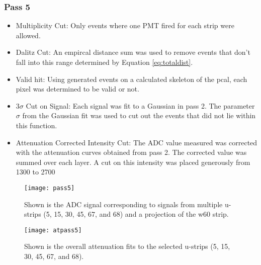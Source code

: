 \subsubsection{Pass 5}
\begin{itemize}
    \item Multiplicity Cut: Only events where one PMT fired for each strip were allowed.
    \item Dalitz Cut: An empircal distance sum was used to remove events that don't fall 
    into this range determined by Equation \ref{eq:totaldist}.
    \item Valid hit: Using generated events on a calculated skeleton of the pcal, each pixel 
    was determined to be valid or not.
    \item 3$\sigma$ Cut on Signal: Each signal was fit to a Gaussian in pass 2. The parameter 
    $\sigma$ from the Gaussian fit was used to cut out the events that did not lie within this function.
    \item Attenuation Corrected Intensity Cut: The ADC value measured was corrected with the 
    attenuation curves obtained from pass 2. The corrected value was summed over each layer. 
    A cut on this intensity was placed generously from 1300 to 2700
\end{itemize}
               
               


\begin{figure}[h]
    \centering
    \texttt{[image: pass5]}
    \caption{Shown is the ADC signal corresponding to signals from multiple u-strips 
    (5, 15, 30, 45, 67, and 68) and a projection of the w60 strip.}
    \label{fig:pass5}
\end{figure}

\begin{figure}[h]
    \centering
    \texttt{[image: atpass5]}
    \caption{Shown is the overall attenuation fits to the selected u-strips 
    (5, 15, 30, 45, 67, and 68).}
    \label{fig:atpass5}
\end{figure}


\FloatBarrier


